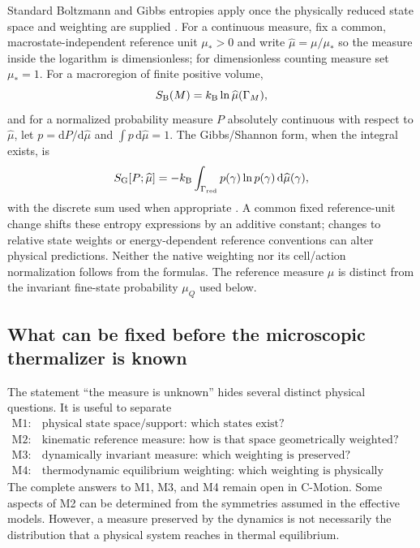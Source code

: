 \documentclass[11pt]{article}
\theoremstyle{definition}
\newcommand{\cmotion}{\mbox{C-Motion}}
\newcommand{\dd}{\mathrm{d}}
\newcommand{\kb}{k_{\mathrm B}}
\newcommand{\GammaRed}{\Gamma_{\mathrm{red}}}
\begin{document}
Standard Boltzmann and Gibbs entropies apply once the physically reduced
state space and weighting are supplied \cite{Boltzmann1877,Gibbs1902,Shannon1948Mathematical}.
For a continuous measure, fix a common, macrostate-independent reference unit
$\mu_*>0$ and write $\widehat\mu=\mu/\mu_*$ so the measure inside the
logarithm is dimensionless; for dimensionless counting measure set $\mu_*=1$.
For a macroregion of finite positive volume,
\begin{equation}
  S_{\rm B}(M)=\kb\ln\widehat\mu(\Gamma_M),
  \label{eq:boltzmann-control}
\end{equation}
and for a normalized probability measure $P$ absolutely continuous with respect
to $\widehat\mu$, let $p=\dd P/\dd\widehat\mu$ and $\int p\,\dd\widehat\mu=1$.
The Gibbs/Shannon form, when the integral exists, is
\begin{equation}
  S_{\rm G}[P;\widehat\mu]
  =-\kb\int_{\GammaRed}p(\gamma)\ln p(\gamma)\,
  \dd\widehat\mu(\gamma),
  \label{eq:gibbs-control}
\end{equation}
with the discrete sum used when appropriate
\cite{Boltzmann1877,Gibbs1902,Shannon1948Mathematical}.  A common fixed reference-unit change shifts these entropy expressions by
an additive constant; changes to relative state weights or energy-dependent
reference conventions can alter physical predictions.  Neither the native
weighting nor its cell/action normalization follows from the formulas.
The reference measure $\widehat\mu$ is distinct from the invariant
fine-state probability $\mu_Q$ used below.

\subsection{What can be fixed before the microscopic thermalizer is known}
\label{sec:prethermalizer-structure}

The statement ``the measure is unknown'' hides several distinct physical questions.  It is
useful to separate
\begin{equation}
  \boxed{
  \begin{array}{ll}
  \mathrm{M1}: & \text{physical state space/support: which states exist?}\\
  \mathrm{M2}: & \text{kinematic reference measure: how is that space geometrically weighted?}\\
  \mathrm{M3}: & \text{dynamically invariant measure: which weighting is preserved?}\\
  \mathrm{M4}: & \text{thermodynamic equilibrium weighting: which weighting is physically realized?}
  \end{array}}
  \label{eq:measure-layers}
\end{equation}
The complete answers to M1, M3, and M4 remain open in \cmotion{}.
Some aspects of M2 can be determined from the symmetries assumed in the
effective models.  However, a measure preserved by the dynamics is not
necessarily the distribution that a physical system reaches in thermal equilibrium.
\end{document}
